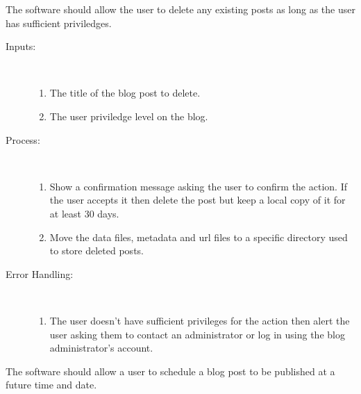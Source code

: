 
The software should allow the user to delete any existing posts as long as the user has sufficient priviledges.

\begin{description}
    \item [Inputs:] ~
    \begin{enumerate}[noitemsep]
        \item {The title of the blog post to delete.}
        \item {The user priviledge level on the blog.}
    \end{enumerate}
    \item [Process:] ~
    \begin{enumerate}[noitemsep]
        \item {Show a confirmation message asking the user to confirm the action. If the user accepts it then delete the
               post but keep a local copy of it for at least 30 days.}
        \item {Move the data files, metadata and url files to a specific directory used to store deleted posts.}
    \end{enumerate}
    \item [Error Handling:] ~
    \begin{enumerate}[noitemsep]
        \item {The user doesn't have sufficient privileges for the action then alert the user asking them to contact an
               administrator or log in using the blog administrator's account.}
    \end{enumerate}
\end{description}


The software should allow a user to schedule a blog post to be published at a future time and date.

